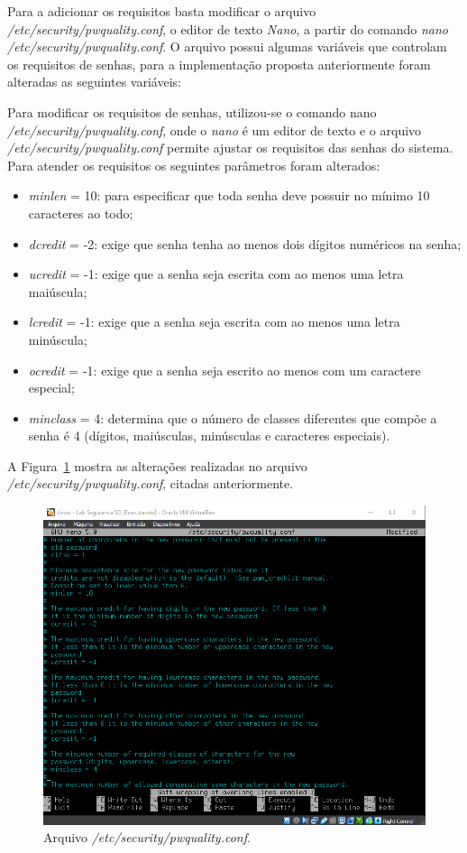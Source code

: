 \documentclass[
  12pt,				%
  oneside,   	        %
  a4paper,			%
  english,			%
  french,				%
  spanish,			%
  brazil,				%
  ]{pacotes/abntex2}
\begin{document}
Para a adicionar os requisitos basta modificar o arquivo \textit{/etc/security/pwquality.conf}, o editor de texto \textit{Nano}, a partir do comando \textit{nano /etc/security/pwquality.conf}. O arquivo possui algumas variáveis que controlam os requisitos de senhas, para a implementação proposta anteriormente foram alteradas as seguintes variáveis:

Para modificar os requisitos de senhas, utilizou-se o comando nano \textit{/etc/security/pwquality.conf}, onde o \textit{nano} é um editor de texto e o arquivo \textit{/etc/security/pwquality.conf} permite ajustar os requisitos das senhas do sistema. Para atender os requisitos os seguintes parâmetros foram alterados:

\begin{itemize}
    \item \textit{minlen} = 10: para especificar que toda senha deve possuir no mínimo 10 caracteres ao todo;
    \item \textit{dcredit} = -2: exige que senha tenha ao menos dois dígitos numéricos na senha;
    \item \textit{ucredit} = -1: exige que a senha seja escrita com ao menos uma letra maiúscula;
    \item \textit{lcredit} = -1: exige que a senha seja escrita com ao menos uma letra minúscula;
    \item \textit{ocredit} = -1: exige que a senha seja escrito ao menos com um caractere especial;
    \item \textit{minclass} = 4: determina que o número de classes diferentes que compõe a senha é 4 (dígitos, maiúsculas, minúsculas e caracteres especiais).
\end{itemize}

A Figura~\ref{fig:pwquality} mostra as alterações realizadas no arquivo \textit{/etc/security/pwquality.conf}, citadas anteriormente.

\begin{figure}[H]
  \centering
  \includegraphics[scale=0.7]{figuras/nano_pwquality.png}
  \caption{Arquivo \textit{/etc/security/pwquality.conf}.}
  \label{fig:pwquality}
\end{figure}
\end{document}
